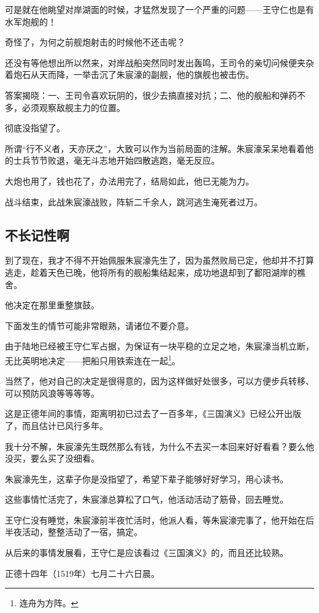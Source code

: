 \begin{multicols}{\theparacolNo}
		可是就在他眺望对岸湖面的时候，才猛然发现了一个严重的问题——王守仁也是有水军炮舰的！

		奇怪了，为何之前舰炮射击的时候他不还击呢？

		还没有等他想出所以然来，对岸战船突然同时发出轰鸣，王司令的亲切问候便夹杂着炮石从天而降，一举击沉了朱宸濠的副舰，他的旗舰也被击伤。

		答案揭晓：一、王司令喜欢玩阴的，很少去搞直接对抗；二、他的舰船和弹药不多，必须观察敌舰主力的位置。

		彻底没指望了。

		所谓“行不义者，天亦厌之”，大致可以作为当前局面的注解。朱宸濠呆呆地看着他的士兵节节败退，毫无斗志地开始四散逃跑，毫无反应。

		大炮也用了，钱也花了，办法用完了，结局如此，他已无能为力。

		战斗结束，此战朱宸濠战败，阵斩二千余人，跳河逃生淹死者过万。

		\subsection{不长记性啊}
		到了现在，我才不得不开始佩服朱宸濠先生了，因为虽然败局已定，他却并不打算逃走，趁着天色已晚，他将所有的舰船集结起来，成功地退却到了鄱阳湖岸的樵舍。

		他决定在那里重整旗鼓。

		下面发生的情节可能非常眼熟，请诸位不要介意。

		由于陆地已经被王守仁军占据，为保证有一块平稳的立足之地，朱宸濠当机立断，无比英明地决定——把船只用铁索连在一起\footnote{连舟为方阵。}。

		当然了，他对自己的决定是很得意的，因为这样做好处很多，可以方便步兵转移、可以预防风浪等等等等。

		这是正德年间的事情，距离明初已过去了一百多年，《三国演义》已经公开出版了，而且估计已风行多年。

		我十分不解，朱宸濠先生既然那么有钱，为什么不去买一本回来好好看看？要么他没买，要么买了没细看。

		朱宸濠先生，这辈子你是没指望了，希望下辈子能够好好学习，用心读书。

		这些事情忙活完了，朱宸濠总算松了口气，他活动活动了筋骨，回去睡觉。

		王守仁没有睡觉，朱宸濠前半夜忙活时，他派人看，等朱宸濠完事了，他开始在后半夜活动，整整活动了一宿，搞定。

		从后来的事情发展看，王守仁是应该看过《三国演义》的，而且还比较熟。

		正德十四年（1519年）七月二十六日晨。


\end{multicols}
